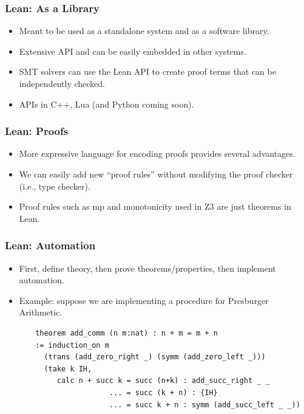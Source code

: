 \documentclass[svgnames,table,mathserif]{beamer}
\begin{document}
\begin{frame}
\frametitle{Lean: As a Library}
  \begin{itemize}
     \item Meant to be used as a {\color{red} standalone system} and as a {\color{red} software library}.
     \item Extensive API and can be easily embedded in other systems.
     \item SMT solvers can use the Lean API to create proof terms that can be independently checked.
     \item APIs in C++, Lua (and Python coming soon).
  \end{itemize}
\end{frame}

\begin{frame}
\frametitle{Lean: Proofs}
  \begin{itemize}
  \item More expressive language for encoding proofs provides several
advantages.
  \item {\color{red} We can easily add new ``proof rules'' without
modifying the proof checker} (i.e., type checker).
  \item Proof rules such as {\color{red} mp} and {\color{red} monotonicity} used in Z3 are just theorems in Lean.
  \end{itemize}
\end{frame}

\begin{frame}[fragile]
\frametitle{Lean: Automation}
  \begin{itemize}
  \item First, define theory, then prove theorems/properties, then implement automation.
  \item Example: suppose we are implementing a procedure for Presburger Arithmetic.
  \end{itemize}

{\tiny
\begin{verbatim}
       theorem add_comm (n m:nat) : n + m = m + n
       := induction_on m
         (trans (add_zero_right _) (symm (add_zero_left _)))
         (take k IH,
            calc n + succ k = succ (n+k) : add_succ_right _ _
                        ... = succ (k + n) : {IH}
                        ... = succ k + n : symm (add_succ_left _ _))
\end{verbatim}
}
\end{frame}
\end{document}
